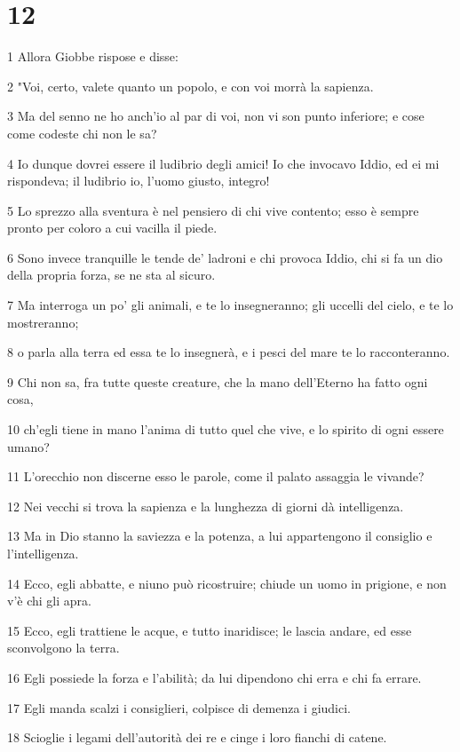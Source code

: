 \chapter{12}

\par 1 Allora Giobbe rispose e disse:
\par 2 "Voi, certo, valete quanto un popolo, e con voi morrà la sapienza.
\par 3 Ma del senno ne ho anch'io al par di voi, non vi son punto inferiore; e cose come codeste chi non le sa?
\par 4 Io dunque dovrei essere il ludibrio degli amici! Io che invocavo Iddio, ed ei mi rispondeva; il ludibrio io, l'uomo giusto, integro!
\par 5 Lo sprezzo alla sventura è nel pensiero di chi vive contento; esso è sempre pronto per coloro a cui vacilla il piede.
\par 6 Sono invece tranquille le tende de' ladroni e chi provoca Iddio, chi si fa un dio della propria forza, se ne sta al sicuro.
\par 7 Ma interroga un po' gli animali, e te lo insegneranno; gli uccelli del cielo, e te lo mostreranno;
\par 8 o parla alla terra ed essa te lo insegnerà, e i pesci del mare te lo racconteranno.
\par 9 Chi non sa, fra tutte queste creature, che la mano dell'Eterno ha fatto ogni cosa,
\par 10 ch'egli tiene in mano l'anima di tutto quel che vive, e lo spirito di ogni essere umano?
\par 11 L'orecchio non discerne esso le parole, come il palato assaggia le vivande?
\par 12 Nei vecchi si trova la sapienza e la lunghezza di giorni dà intelligenza.
\par 13 Ma in Dio stanno la saviezza e la potenza, a lui appartengono il consiglio e l'intelligenza.
\par 14 Ecco, egli abbatte, e niuno può ricostruire; chiude un uomo in prigione, e non v'è chi gli apra.
\par 15 Ecco, egli trattiene le acque, e tutto inaridisce; le lascia andare, ed esse sconvolgono la terra.
\par 16 Egli possiede la forza e l'abilità; da lui dipendono chi erra e chi fa errare.
\par 17 Egli manda scalzi i consiglieri, colpisce di demenza i giudici.
\par 18 Scioglie i legami dell'autorità dei re e cinge i loro fianchi di catene.
